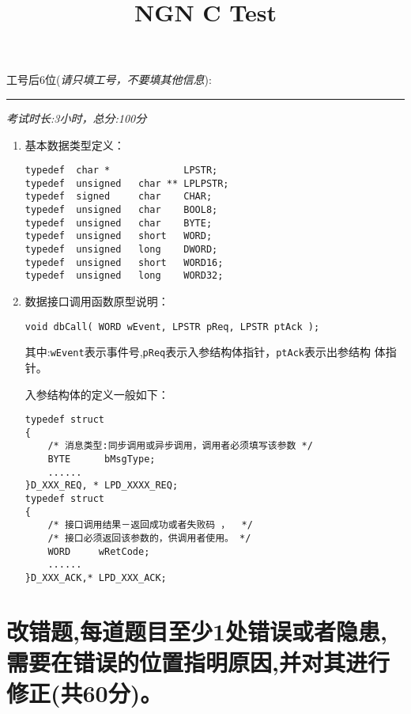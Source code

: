 ﻿\documentclass  [11pt,twocolumn]{article}
\title{NGN C Test}
\author{}
\date{}
\begin{document}
\begin{minipage}{0.9\linewidth}
工号后6位(\textit{请只填工号，不要填其他信息}):\rule[-1pt]{.4\textwidth}{1pt}
\end{minipage}


\begin{flushright}
{\small{\textit{考试时长:3小时，总分:100分}}}
\end{flushright}

\normalsize{}

\begin{enumerate}
    \item 基本数据类型定义：
\begin{lstlisting}
typedef  char *             LPSTR;
typedef  unsigned   char ** LPLPSTR;
typedef  signed     char    CHAR;
typedef  unsigned   char    BOOL8;
typedef  unsigned   char    BYTE;
typedef  unsigned   short   WORD;
typedef  unsigned   long    DWORD;
typedef  unsigned   short   WORD16;
typedef  unsigned   long    WORD32;
\end{lstlisting}
    \item 数据接口调用函数原型说明：
\begin{lstlisting}
void dbCall( WORD wEvent, LPSTR pReq, LPSTR ptAck );
\end{lstlisting}
其中:\lstinline{wEvent}表示事件号,\lstinline{pReq}表示入参结构体指针，\lstinline{ptAck}表示出参结构
体指针。

入参结构体的定义一般如下：
\begin{lstlisting}
typedef struct 
{
    /* 消息类型:同步调用或异步调用，调用者必须填写该参数 */
    BYTE      bMsgType;  
    ......
}D_XXX_REQ, * LPD_XXXX_REQ;
typedef struct
{
    /* 接口调用结果－返回成功或者失败码 ，  */
    /* 接口必须返回该参数的，供调用者使用。 */
    WORD     wRetCode;
    ......
}D_XXX_ACK,* LPD_XXX_ACK;
\end{lstlisting}
\end{enumerate}

\section{改错题,每道题目至少1处错误或者隐患,需要在错误的位置指明原因,并对其进行修正(共60分)。}

\subsection{}
\end{document}
